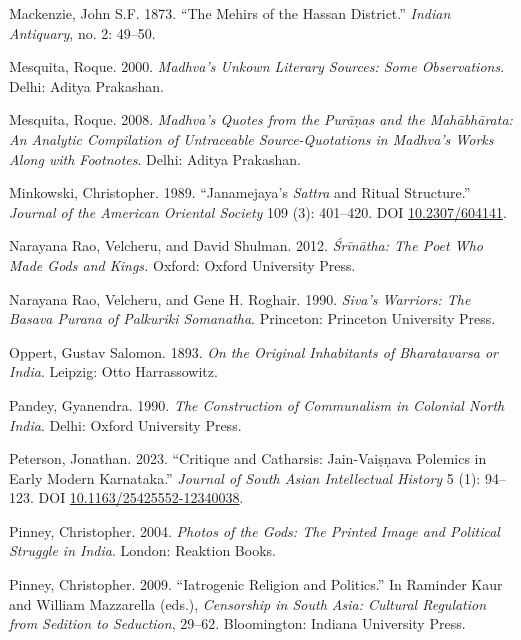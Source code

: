 \begin{hangparas}{0.125in}{1}
          \label{Mackenzie1873}Mackenzie, John S.\thinskip{}F. 1873. “The Mehirs of the Hassan District.” \emph{Indian Antiquary}, no. 2: 49–50.\medskip


          \label{Mesquita2000}Mesquita, Roque. 2000. \emph{Madhva’s Unkown Literary Sources: Some Observations}. Delhi: Aditya Prakashan.\medskip


          \label{Mesquita2008}Mesquita, Roque. 2008. \emph{Madhva’s Quotes from the Purāṇas and the Mahābhārata: An Analytic Compilation of Untraceable Source-Quotations in Madhva’s Works Along with Footnotes}. Delhi: Aditya Prakashan.\medskip


          \label{Minkowski1989}Minkowski, Christopher. 1989. “Janamejaya’s \emph{Sattra} and Ritual Structure.” \emph{Journal of the American Oriental Society} 109 (3): 401–420. DOI \href{https://doi.org/10.2307/604141}{10.2307/604141}.\medskip


          \label{Rao2012}Narayana Rao, Velcheru, and David Shulman. 2012. \emph{Śrīnātha: The Poet Who Made Gods and Kings.} Oxford: Oxford University Press.\medskip


          \label{Rao1990}Narayana Rao, Velcheru, and Gene H. Roghair. 1990. \emph{Siva’s Warriors: The Basava Purana of Palkuriki Somanatha}. Princeton: Princeton University Press.\medskip


          \label{Oppert1893}Oppert, Gustav Salomon. 1893. \emph{On the Original Inhabitants of Bharatavarsa or India}. Leipzig: Otto Harrassowitz.\medskip


          \label{Pandey1990}Pandey, Gyanendra. 1990. \emph{The Construction of Communalism in Colonial North India}. Delhi: Oxford University Press.\medskip


          \label{Peterson2023}Peterson, Jonathan. 2023. “Critique and Catharsis: Jain-Vaiṣṇava Polemics in Early Modern Karnataka.” \emph{Journal of South Asian Intellectual History} 5 (1): 94–123. DOI \href{https://doi.org/10.1163/25425552-12340038}{10.1163/\allowbreak{}25425552-12340038}.\medskip


          \label{Pinney2004}Pinney, Christopher. 2004. \emph{Photos of the Gods: The Printed Image and Political Struggle in India}. London: Reaktion Books.\medskip


          \label{Pinney2009}Pinney, Christopher. 2009. “Iatrogenic Religion and Politics.” In Raminder Kaur and William Mazzarella (eds.), \emph{Censorship in South Asia: Cultural Regulation from Sedition to Seduction}, 29–62. Bloomington: Indiana University Press.\medskip



\end{hangparas}
